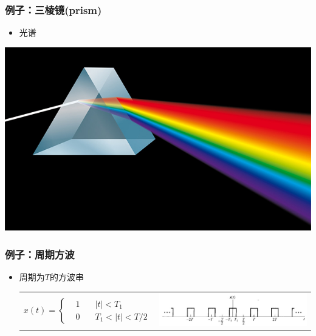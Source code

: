\documentclass[CJKutf8,xcolor=pdftex,dvipsnames,table]{beamer}
\begin{document}
\begin{CJK*}{UTF8}{song}
  \begin{frame}
    \frametitle{例子：三棱镜(prism)}
    \begin{itemize}
    \item 光谱
    \end{itemize}
    \begin{center}
      \includegraphics[scale=1]{prism}
    \end{center}
  \end{frame}  
    
  \begin{frame}
    \frametitle{例子：周期方波}
    \begin{itemize}
    \item 周期为$T$的方波串 \\
	\begin{tabular}{ll}
	\raisebox{-.5\height}

    \begin{math}
x(t) = 
\left\{
    \begin {aligned}
         & 1 \quad & |t| < T_1 \\
         & 0 \quad & T_1 < |t| < T/2                  
    \end{aligned}
\right.
	\end{math}

&
    \includegraphics[valign=m,scale=.3]{ss-c-f3-6}    \\
    \end{tabular}  


\end{itemize}
\end{frame}
\end{CJK*}
\end{document}
